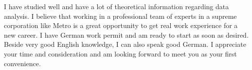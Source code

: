 \documentclass[11pt,a4paper,sans]{moderncv}        %
\begin{document}
I have studied well and have a lot of theoretical information regarding data analysis. I believe that working in a professional team of experts in a supreme corporation like Metro is a great opportunity to get real work experience for a new career. I have German work permit and am ready to start as soon as desired. Beside very good English knowledge, I can also speak good German. 
 I appreciate your time and consideration and am looking forward to meet you as your first convenience.
 \vspace{3mm}
 
\makeletterclosing
\end{document}
